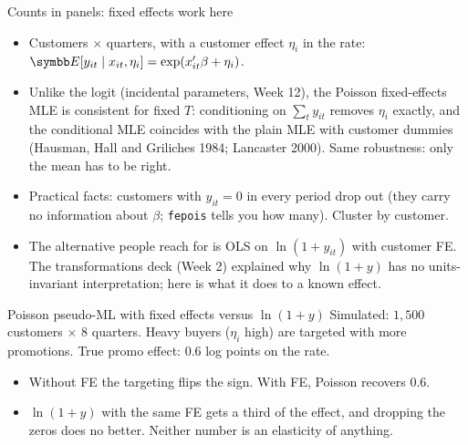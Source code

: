 \documentclass[aspectratio=169,11pt]{beamer}
\begin{document}
\begin{frame}{Counts in panels: fixed effects work here}
\begin{itemize}
	\item Customers $\times$ quarters, with a customer effect $\eta_i$ in the rate:
	$\E[y_{it} \mid x_{it}, \eta_i] = \exp(x_{it}'\beta + \eta_i)$.
	\medskip
	\item Unlike the logit (incidental parameters, Week 12), the Poisson fixed-effects MLE is
	\alert{consistent for fixed $T$}: conditioning on $\sum_t y_{it}$ removes $\eta_i$ exactly, and the
	conditional MLE coincides with the plain MLE with customer dummies (Hausman, Hall and Griliches 1984;
	Lancaster 2000). Same robustness: only the mean has to be right.
	\medskip
	\item Practical facts: customers with $y_{it} = 0$ in every period drop out (they carry no information
	about $\beta$; \texttt{fepois} tells you how many). Cluster by customer.
	\medskip
	\item The alternative people reach for is OLS on $\ln(1 + y_{it})$ with customer FE. The transformations
	deck (Week 2) explained why $\ln(1+y)$ has no units-invariant interpretation; here is what it does to a
	known effect.
\end{itemize}
\end{frame}


\begin{frame}{Poisson pseudo-ML with fixed effects versus $\ln(1+y)$}
Simulated: $1{,}500$ customers $\times$ $8$ quarters. Heavy buyers ($\eta_i$ high) are targeted with more
promotions. True promo effect: $0.6$ log points on the rate.
\begin{center}
\small

\end{center}
\medskip
\begin{itemize}
	\item Without FE the targeting flips the sign. With FE, Poisson recovers $0.6$.
	\item $\ln(1+y)$ with the same FE gets a third of the effect, and dropping the zeros does no better.
	Neither number is an elasticity of anything.
\end{itemize}
\end{frame}
\end{document}
